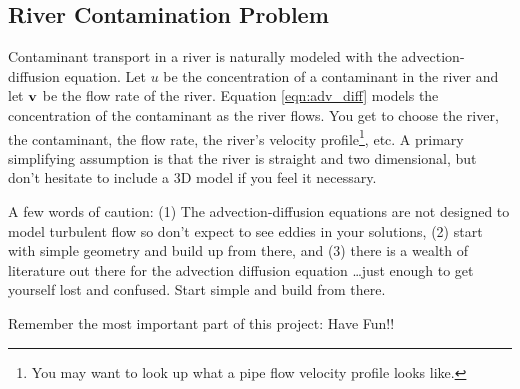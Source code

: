 \subsection*{River Contamination Problem}
Contaminant transport in a river is naturally modeled with the advection-diffusion
equation.  Let $u$ be the concentration of a contaminant in the river and let ${\bf v}$ be the
flow rate of the river.  Equation \eqref{eqn:adv_diff} models the concentration of the
contaminant as the river flows.  You get to choose the river, the contaminant, the flow
rate, the river's velocity profile\footnote{You may want to look up what a pipe flow
velocity profile looks like.}, etc.  A primary simplifying assumption is that the
river is straight and two dimensional, but don't hesitate to include a 3D model if you
feel it necessary.


A few words of caution: (1) The advection-diffusion equations are not designed to model
turbulent flow so don't expect to see eddies in your solutions, (2) start with simple
geometry and build up from there, and (3) there is a wealth of literature out there for
the advection diffusion equation \dots just enough to get yourself lost and confused.
Start simple and build from there.  

Remember the most important part of this project: Have Fun!!



